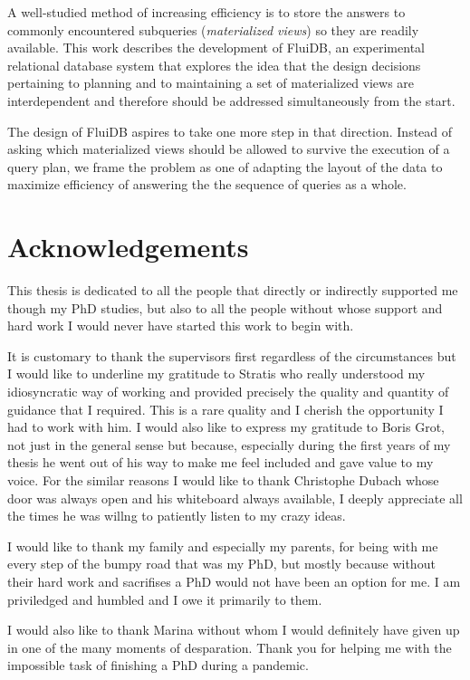 \begin{precontent}
A well-studied method of increasing efficiency is to store the answers to commonly encountered subqueries (\emph{materialized views}) so they are readily available. This work describes the development of FluiDB, an experimental relational database system that explores the idea that the design decisions pertaining to planning and to maintaining a set of materialized views are interdependent and therefore should be addressed simultaneously from the start.

The design of FluiDB aspires to take one more step in that direction. Instead of asking which materialized views should be allowed to survive the execution of a query plan, we frame the problem as one of adapting the layout of the data to maximize efficiency of answering the the sequence of queries as a whole.

\chapter{Acknowledgements}%

This thesis is dedicated to all the people that directly or indirectly
supported me though my PhD studies, but also to all the people
without whose support and hard work I would never have started this
work to begin with.

It is customary to thank the supervisors first regardless of the
circumstances but I would like to underline my gratitude to Stratis
who really understood my idiosyncratic way of working and provided
precisely the quality and quantity of guidance that I required. This
is a rare quality and I cherish the opportunity I had to work with
him. I would also like to express my gratitude to Boris Grot, not just
in the general sense but because, especially during the first years of
my thesis he went out of his way to make me feel included and gave
value to my voice. For the similar reasons I would like to thank
Christophe Dubach whose door was always open and his whiteboard always
available, I deeply appreciate all the times he was willng to
patiently listen to my crazy ideas.

I would like to thank my family and especially my parents, for being
with me every step of the bumpy road that was my PhD, but mostly
because without their hard work and sacrifises a PhD would not have
been an option for me. I am priviledged and humbled and I owe it
primarily to them.

I would also like to thank Marina without whom I would definitely have
given up in one of the many moments of desparation. Thank you for
helping me with the impossible task of finishing a PhD during a
pandemic.


\end{precontent}
